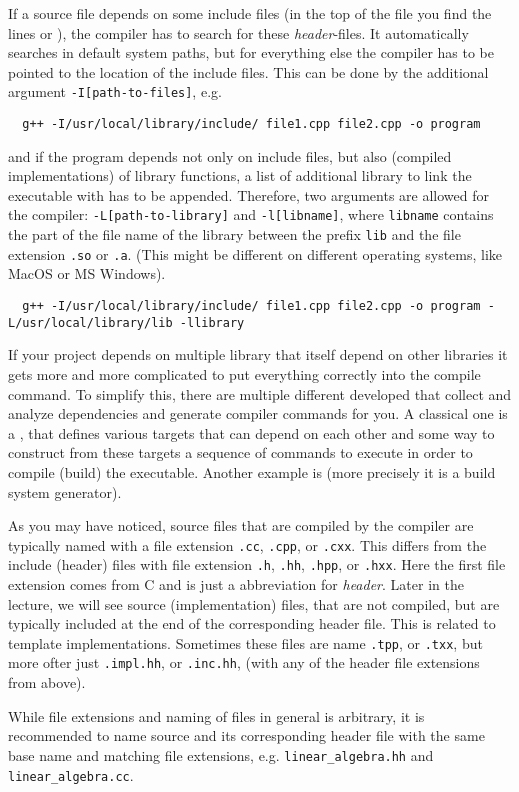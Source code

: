 If a source file depends on some include files (in the top of the file you find the lines  or ), the
compiler has to search for these \textit{header}-files. It automatically searches in default system paths, but for everything else the compiler
has to be pointed to the location of the include files. This can be done by the additional argument \texttt{-I[path-to-files]}, e.g.
%
\begin{verbatim}
  g++ -I/usr/local/library/include/ file1.cpp file2.cpp -o program
\end{verbatim}
%
and if the program depends not only on include files, but also  (compiled implementations) of library functions, a list of additional
library to link the executable with has to be appended. Therefore, two arguments are allowed for the compiler: \texttt{-L[path-to-library]} and
\texttt{-l[libname]}, where \texttt{libname} contains the part of the file name of the library between the prefix \texttt{lib} and the file
extension \texttt{.so} or \texttt{.a}. (This might be different on different operating systems, like MacOS or MS Windows).
%
\begin{verbatim}
  g++ -I/usr/local/library/include/ file1.cpp file2.cpp -o program -L/usr/local/library/lib -llibrary
\end{verbatim}
%

If your project depends on multiple library that itself depend on other libraries it gets more and more complicated to put everything correctly
into the compile command. To simplify this, there are multiple different  developed that collect and analyze dependencies
and generate compiler commands for you. A classical one is a , that defines various targets that can depend on each other and
some way to construct from these targets a sequence of commands to execute in order to compile (build) the executable. Another example is
 (more precisely it is a build system generator).

\begin{rem}
As you may have noticed, source files that are compiled by the compiler are typically named with a file extension \texttt{.cc}, \texttt{.cpp},
or \texttt{.cxx}. This differs from the include (header) files with file extension \texttt{.h}, \texttt{.hh}, \texttt{.hpp}, or \texttt{.hxx}.
Here the first file extension comes from C and is just a abbreviation for \textit{header}. Later in the lecture, we will see source (implementation)
files, that are not compiled, but are typically included at the end of the corresponding header file. This is related to template
implementations. Sometimes these files are name \texttt{.tpp}, or \texttt{.txx}, but more ofter just \texttt{.impl.hh}, or \texttt{.inc.hh},
(with any of the header file extensions from above).

While file extensions and naming of files in general is arbitrary, it is recommended to name source and its corresponding header file with the
same base name and matching file extensions, e.g. \texttt{linear\_algebra.hh} and \texttt{linear\_algebra.cc}.
\end{rem}


